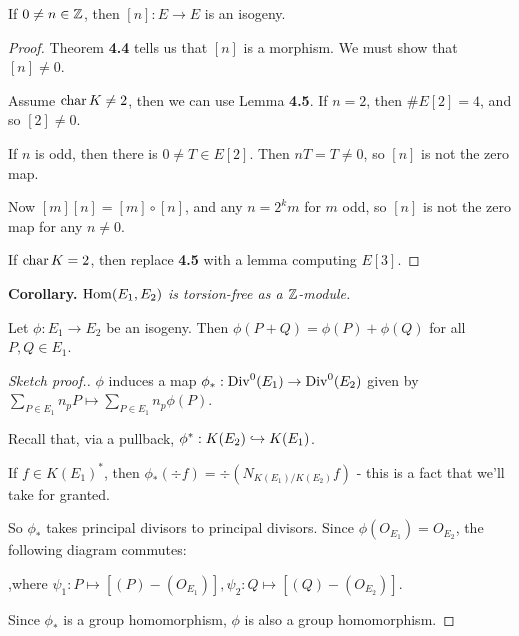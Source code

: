\documentclass[10pt,a4paper]{article}
\begin{document}
\begin{lemma}
  If $0 \neq n \in \mathbb{Z}$, then $[n] : E \to E$ is an isogeny.
\end{lemma}
\begin{proof}
  Theorem \textbf{4.4} tells us that $[n]$ is a morphism. We must show that $[n]\neq 0$.

  Assume $\operatorname{char} K \neq 2$, then we can use Lemma \textbf{4.5}. If $n=2$, then $\#E[2] = 4$, and so $[2] \neq 0$.

  If $n$ is odd, then there is $0\neq T \in E[2]$. Then $nT = T \neq 0$, so $[n]$ is not the zero map.

  Now $[m][n] = [m]\circ[n]$, and any $n = 2^k m$ for $m$ odd, so $[n]$ is not the zero map for any $n \neq 0$.

  If $\operatorname{char} K =2$, then replace \textbf{4.5} with a lemma computing $E[3]$.
\end{proof}
\textbf{Corollary.} \textit{$\operatorname{Hom}(E_1, E_2)$ is torsion-free as a $\mathbb{Z}$-module.}
\begin{lemma}
  Let $\phi:E_1 \to E_2$ be an isogeny. Then $\phi(P+Q) = \phi(P) + \phi(Q)$ for all $P, Q \in E_1$.
\end{lemma}
\begin{proof}[Sketch proof.]
  $\phi$ induces a map $\phi_\ast : \operatorname{Div}^0(E_1) \to \operatorname{Div}^0(E_2)$ given by $\sum\limits_{P\in E_1}n_p P \mapsto \sum\limits_{P \in E_1}n_p \phi(P)$.

  Recall that, via a pullback, $\phi^\ast : K(E_2) \hookrightarrow K(E_1)$.

  If $f \in K(E_1)^\ast$, then $\phi_\ast(\div f)=\div(N_{K(E_1)/K(E_2)}f)$ - this is a fact that we'll take for granted.

  So $\phi_\ast$ takes principal divisors to principal divisors. Since $\phi(O_{E_1}) = O_{E_2}$, the following diagram commutes:
  ,where $\psi_1:P \mapsto [(P) -(O_{E_1})], \psi_2:Q \mapsto [(Q)-(O_{E_2})]$.

  Since $\phi_\ast$ is a group homomorphism, $\phi$ is also a group homomorphism.
\end{proof}
\end{document}
